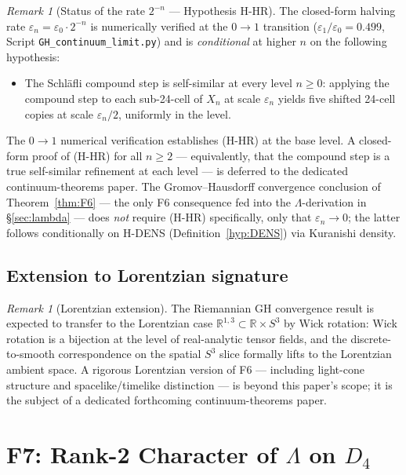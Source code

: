 \documentclass[12pt]{article}
\theoremstyle{definition}
\theoremstyle{remark}
\newtheorem{remark}[theorem]{Remark}
\begin{document}
\begin{remark}[Status of the rate $2^{-n}$ --- Hypothesis H-HR]\label{rem:rate-status}
The closed-form halving rate $\varepsilon_n = \varepsilon_0 \cdot 2^{-n}$ is numerically verified at the $0 \to 1$ transition ($\varepsilon_1/\varepsilon_0 = 0.499$, Script \texttt{GH\_continuum\_limit.py}) and is \emph{conditional} at higher $n$ on the following hypothesis:
\begin{itemize}
\item[\textbf{(H-HR)}] The Schl\"afli compound step is self-similar at every level $n \ge 0$: applying the compound step to each sub-24-cell of $X_n$ at scale $\varepsilon_n$ yields five shifted 24-cell copies at scale $\varepsilon_n / 2$, uniformly in the level.
\end{itemize}
The $0 \to 1$ numerical verification establishes (H-HR) at the base level. A closed-form proof of (H-HR) for all $n \ge 2$ --- equivalently, that the compound step is a true self-similar refinement at each level --- is deferred to the dedicated continuum-theorems paper. The Gromov--Hausdorff convergence conclusion of Theorem~\ref{thm:F6} --- the only F6 consequence fed into the $\Lambda$-derivation in \S\ref{sec:lambda} --- does \emph{not} require (H-HR) specifically, only that $\varepsilon_n \to 0$; the latter follows conditionally on H-DENS (Definition~\ref{hyp:DENS}) via Kuranishi density.
\end{remark}

\subsection{Extension to Lorentzian signature}

\begin{remark}[Lorentzian extension]\label{rem:lorentzian}
The Riemannian GH convergence result is expected to transfer to the Lorentzian case $\mathbb{R}^{1,3} \subset \mathbb{R} \times S^3$ by Wick rotation: Wick rotation is a bijection at the level of real-analytic tensor fields, and the discrete-to-smooth correspondence on the spatial $S^3$ slice formally lifts to the Lorentzian ambient space. A rigorous Lorentzian version of F6 --- including light-cone structure and spacelike/timelike distinction --- is beyond this paper's scope; it is the subject of a dedicated forthcoming continuum-theorems paper.
\end{remark}

\section{F7: Rank-2 Character of $\Lambda$ on $D_4$}\label{sec:F7}
\end{document}
